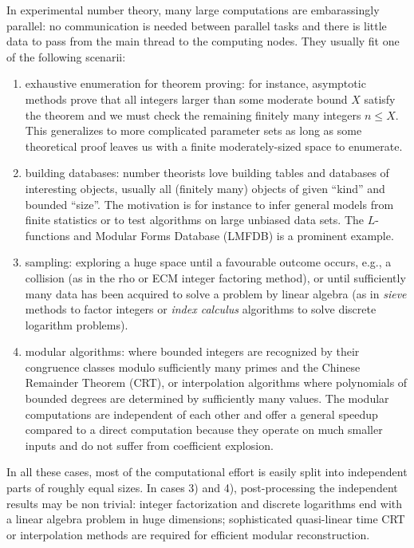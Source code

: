 \documentclass{deliverablereport}
\begin{document}
In experimental number theory, many large computations are embarassingly
parallel: no communication is needed between parallel tasks and there is
little data to pass from the main thread to the computing nodes. They usually
fit one of the following scenarii:
\begin{enumerate}
  \item exhaustive enumeration for theorem proving: for instance, asymptotic
    methods prove that all integers larger than some moderate bound $X$
    satisfy the theorem and we must check the remaining finitely many
    integers $n \leq X$. This generalizes to more complicated parameter sets
    as long as some theoretical proof leaves us with a finite
    moderately-sized space to enumerate.

  \item building databases: number theorists love building tables and
    databases of interesting objects, usually all (finitely many) objects
    of given ``kind'' and bounded ``size''. The motivation is for instance
    to infer general models from finite statistics or to test algorithms on
    large unbiased data sets. The $L$-functions and Modular Forms Database
    (LMFDB) is a prominent example.
    
  \item sampling: exploring a huge space until a favourable outcome occurs,
    e.g., a collision (as in the rho or ECM integer factoring method), or
    until sufficiently many data has been acquired to solve a problem by
    linear algebra (as in \emph{sieve} methods to factor integers or
    \emph{index calculus} algorithms to solve discrete logarithm problems).
    
  \item modular algorithms: where bounded integers are recognized by their
    congruence classes modulo sufficiently many primes and the Chinese
    Remainder Theorem (CRT), or interpolation algorithms where polynomials of
    bounded degrees are determined by sufficiently many values. The modular
    computations are independent of each other and offer a general speedup
    compared to a direct computation because they operate on much smaller 
    inputs and do not suffer from coefficient explosion.
\end{enumerate}

In all these cases, most of the computational effort is easily split into
independent parts of roughly equal sizes. In cases 3) and 4),
post-processing the independent results may be non trivial: integer
factorization and discrete logarithms end with a linear algebra problem in
huge dimensions; sophisticated quasi-linear time CRT or interpolation methods
are required for efficient modular reconstruction.
\end{document}
